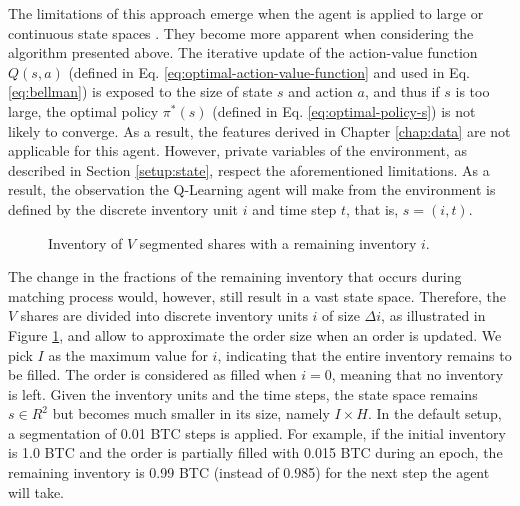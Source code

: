 The limitations of this approach emerge when the agent is applied to large or continuous state spaces \cite{gaskett2002q}.
They become more apparent when considering the algorithm presented above.
The iterative update of the action-value function $Q(s,a)$ (defined in Eq. \ref{eq:optimal-action-value-function} and used in Eq. \ref{eq:bellman}) is exposed to the size of state $s$ and action $a$, and thus if $s$ is too large, the optimal policy $\pi^*(s)$ (defined in Eq. \ref{eq:optimal-policy-s}) is not likely to converge.
As a result, the features derived in Chapter \ref{chap:data} are not applicable for this agent.
However, private variables of the environment, as described in Section \ref{setup:state}, respect the aforementioned limitations.
As a result, the observation the Q-Learning agent will make from the environment is defined by the discrete inventory unit $i$ and time step $t$, that is, $s=(i, t)$.
\begin{figure}[H]
    \centering
    \caption{Inventory of $V$ segmented shares with a remaining inventory $i$.}
    \label{fig:setup-inventory}
\end{figure}
The change in the fractions of the remaining inventory that occurs during matching process would, however, still result in a vast state space.
Therefore, the $V$ shares are divided into discrete inventory units $i$ of size $\Delta{i}$, as illustrated in Figure \ref{fig:setup-inventory}, and allow to approximate the order size when an order is updated.
We pick $I$ as the maximum value for $i$, indicating that the entire inventory remains to be filled.
The order is considered as filled when $i=0$, meaning that no inventory is left.
Given the inventory units and the time steps, the state space remains $s \in R^2$ but becomes much smaller in its size, namely $I \times H$.
In the default setup, a segmentation of 0.01 BTC steps is applied.
For example, if the initial inventory is 1.0 BTC and the order is partially filled with 0.015 BTC during an epoch, the remaining inventory is 0.99 BTC (instead of 0.985) for the next step the agent will take.

